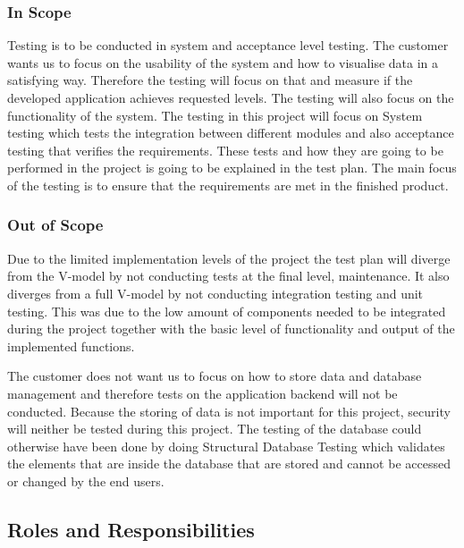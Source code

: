 \subsubsection{In Scope}
Testing is to be conducted in system and acceptance level testing. The customer wants us to focus on the usability of the system and how to visualise data in a satisfying way.  Therefore the testing will focus on that and measure if the developed application achieves requested levels. The testing will also focus on the functionality of the system. The testing in this project will focus on System testing which tests the integration between different modules and also acceptance testing that verifies the requirements. These tests and how they are going to be performed in the project is going to be explained in the test plan. The main focus of the testing is to ensure that the requirements are met in the finished product. 

\subsubsection{Out of Scope} 
Due to the limited implementation levels of the project the test plan will diverge from the V-model by not conducting tests at the final level, maintenance. It also diverges from a full V-model by not conducting integration testing and unit testing. This was due to the low amount of components needed to be integrated during the project together with the basic level of functionality and output of the implemented functions. \newline

\noindent The customer does not want us to focus on how to store data and database management and therefore tests on the application backend will not be conducted. Because the storing of data is not important  for this project, security will neither be tested during this project. The testing of the database could otherwise have been done by doing Structural Database Testing which validates the elements that are inside the database that are stored and cannot be accessed or changed by the end users. 


\subsection{Roles and Responsibilities}

